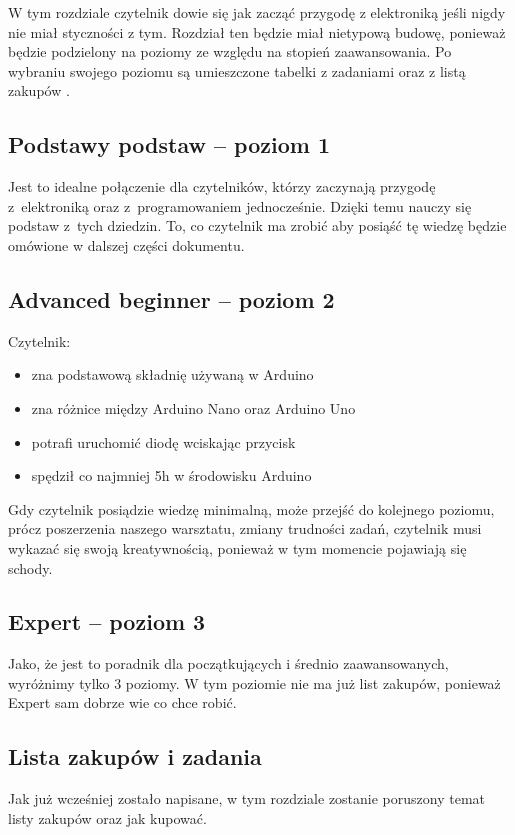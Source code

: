 
W tym rozdziale czytelnik dowie się jak zacząć przygodę z elektroniką jeśli nigdy nie miał styczności z tym. Rozdział ten będzie miał
nietypową budowę, ponieważ będzie podzielony na poziomy ze względu na stopień zaawansowania. Po wybraniu swojego poziomu są umieszczone tabelki z zadaniami oraz z listą zakupów .
\subsection{Podstawy podstaw -- poziom 1}
Jest to idealne połączenie dla czytelników, którzy zaczynają przygodę z~elektroniką oraz z~programowaniem jednocześnie. Dzięki temu nauczy się podstaw z~tych dziedzin. 
To, co czytelnik ma zrobić aby posiąść tę wiedzę będzie omówione w dalszej części dokumentu.
\subsection{Advanced beginner -- poziom 2}
Czytelnik:
\begin{itemize}
\item zna podstawową składnię używaną w Arduino
\item zna różnice między Arduino Nano oraz Arduino Uno
\item potrafi uruchomić diodę wciskając przycisk
\item spędził co najmniej 5h w środowisku Arduino
\end{itemize}

Gdy czytelnik posiądzie wiedzę minimalną, może przejść do kolejnego poziomu, prócz poszerzenia naszego warsztatu, zmiany trudności zadań, czytelnik musi wykazać się swoją kreatywnością, ponieważ w tym momencie pojawiają się schody.

\subsection{Expert -- poziom 3}
Jako, że jest to poradnik dla początkujących i średnio zaawansowanych, wyróżnimy tylko 3 poziomy. W tym poziomie nie ma już list zakupów, ponieważ Expert sam dobrze wie co chce robić.
\subsection{Lista zakupów i zadania}
Jak już wcześniej zostało napisane, w tym rozdziale zostanie poruszony temat listy zakupów oraz jak kupować.

